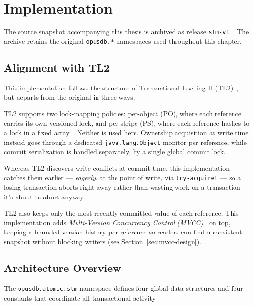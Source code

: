\chapter{Implementation}
\label{ch:implementation}

The source snapshot accompanying this thesis is archived as release
\texttt{stm-v1}~\cite{chapidze2026stm}. The archive retains the original
\texttt{opusdb.*} namespaces used throughout this chapter.

\section{Alignment with TL2}
This implementation follows the structure of Transactional Locking II
(TL2)~\cite{dice2006transactional}, but departs from the original in three
ways.

TL2 supports two lock-mapping policies: per-object (PO), where each reference
carries its own versioned lock, and per-stripe (PS), where each
reference hashes to a lock in a fixed array~\cite{dice2006transactional}.
Neither is used here. Ownership acquisition at write time instead goes
through a dedicated \texttt{java.lang.Object} monitor per reference, while
commit serialization is handled separately, by a single global commit lock.

Whereas TL2 discovers write conflicts at commit time, this implementation
catches them earlier — \emph{eagerly}, at the point of write, via \texttt{try-acquire!} — so a
losing transaction aborts right away rather than wasting work on a
transaction it's about to abort anyway.

TL2 also keeps only the most recently committed value of each reference.
This implementation adds \emph{Multi-Version Concurrency Control
  (MVCC)}~\cite{bernstein1983} on top, keeping a bounded version history
per reference so readers can find a consistent snapshot without
blocking writers (see Section~\ref{sec:mvcc-design}).

\section{Architecture Overview}
The \texttt{opusdb.atomic.stm} namespace defines four global data structures
and four constants that coordinate all transactional activity.

